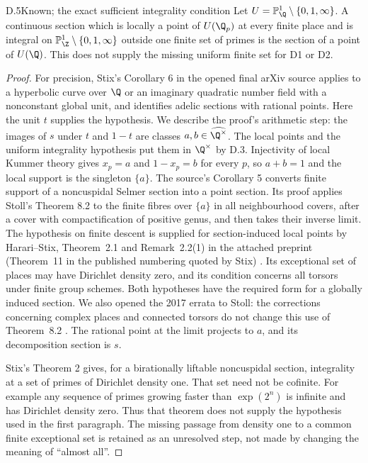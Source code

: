 \begin{claim}{D.5}{Known; the exact sufficient integrality condition}
Let $U=\mathbb P^1_\Q\setminus\{0,1,\infty\}$. A continuous section
which is locally a point of $U(\Q_p)$ at every finite place and is
integral on $\mathbb P^1_\Z\setminus\{0,1,\infty\}$ outside one
finite set of primes is the section of a point of $U(\Q)$.
This does not supply the missing uniform finite set for D1 or D2.
\end{claim}
\begin{proof}
For precision, Stix's Corollary 6 in the opened final arXiv source
\citep{D_Stix2015} applies to a hyperbolic curve over $\Q$ or an
imaginary quadratic number field with a nonconstant global unit,
and identifies adelic sections with rational points. Here the unit
$t$ supplies the hypothesis. We describe the proof's arithmetic
step: the images of $s$ under $t$ and $1-t$ are classes
$a,b\in\widehat{\Q^\times}$. The local points and the uniform
integrality hypothesis put them in $\Q^\times$ by D.3. Injectivity
of local Kummer theory gives $x_p=a$ and $1-x_p=b$ for every $p$,
so $a+b=1$ and the local support is the singleton $\{a\}$.
The source's Corollary 5 converts finite support of a noncuspidal
Selmer section into a point section. Its proof applies Stoll's
Theorem 8.2 to the finite fibres over $\{a\}$ in all neighbourhood
covers, after a cover with compactification of positive genus,
and then takes their inverse limit. The hypothesis on finite
descent is supplied for section-induced local points by
Harari--Stix, Theorem~2.1 and Remark~2.2(1) in the attached
preprint (Theorem~11 in the published numbering quoted by Stix)
\citep{D_HarariStix2012,D_Stoll2007}. Its exceptional set of
places may have Dirichlet density zero, and its condition concerns
all torsors under finite group schemes. Both hypotheses have the
required form for a globally induced section. We also opened the
2017 errata to Stoll: the corrections concerning complex places
and connected torsors do not change this use of Theorem~8.2
\citep{D_StollErrata2017}.
The rational point at the limit projects to $a$, and its
decomposition section is $s$.

Stix's Theorem 2 gives, for a birationally liftable noncuspidal
section, integrality at a set of primes of Dirichlet density one.
That set need not be cofinite. For example any sequence of primes
growing faster than $\exp(2^n)$ is infinite and has Dirichlet
density zero. Thus that theorem does not supply the hypothesis
used in the first paragraph. The missing passage from density
one to a common finite exceptional set is retained as an
unresolved step, not made by changing the meaning of ``almost all''.
\end{proof}

